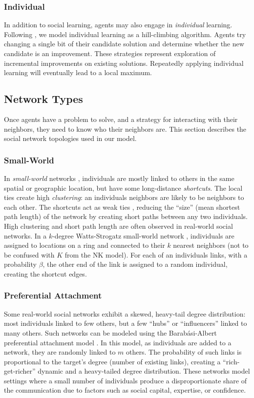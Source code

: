 \documentclass[manuscript,screen,review,acmsmall]{acmart}
\begin{document}
\subsubsection{Individual}
In addition to social learning, agents may also engage in {\em individual}
learning.
Following \cite{barkoczi_social_2016},
we model individual learning as a hill-climbing algorithm.
Agents try changing a single bit of their candidate solution and determine
whether the new candidate is an improvement.
These strategies represent exploration of incremental improvements on existing
solutions.
Repeatedly applying individual learning will eventually lead to a local
maximum.

\subsection{Network Types}
Once agents have a problem to solve, and a strategy for interacting with
their neighbors, they need to know who their neighbors are.
This section describes the social network topologies used in our model.

\subsubsection{Small-World}
In {\em small-world} networks
\cite{watts_collective_1998},
individuals are mostly linked to others in the
same spatial or geographic location,
but have some long-distance {\em shortcuts}.
The local ties create high {\em clustering}:
an individuals neighbors are likely to be neighbors to each other.
The shortcuts act as weak ties \cite{granovetter_strength_1973},
reducing the ``size'' (mean shortest path length)
of the network by creating short paths
between any two individuals.
High clustering and short path length are often observed in real-world social
networks.
In a $k$-degree Watts-Strogatz small-world network \cite{watts_collective_1998},
individuals are assigned to locations on a ring and connected to their
$k$ nearest neighbors (not to be confused with $K$ from the NK model).
For each of an individuals links,
with a probability $\beta$,
the other end of the link is assigned to a random individual,
creating the shortcut edges.

\subsubsection{Preferential Attachment}
Some real-world social networks exhibit a skewed, heavy-tail degree distribution:
most individuals linked to few others,
but a few ``hubs'' or ``influencers'' linked to many others.
Such networks can be modeled using the Barabási-Albert preferential attachment model
\cite{barabasi_emergence_1999}.
In this model, as individuals are added to a network,
they are randomly linked to $m$ others.
The probability of such links is proportional to the target's degree
(number of existing links),
creating a ``rich-get-richer'' dynamic and a heavy-tailed degree distribution.
These networks model settings where a small number of individuals produce a disproportionate share of the communication due to factors such as social capital, expertise, or confidence.
\end{document}
